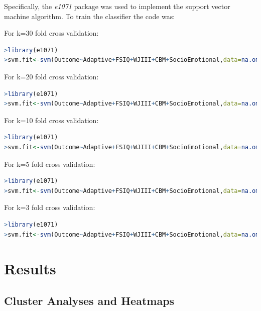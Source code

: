 \documentclass[twoside]{article}
\begin{document}
Specifically, the \textit{e1071} package was used to implement the support vector machine algorithm. To train the classifier the code was:

For k=30 fold cross validation:
\begin{lstlisting}[language=R]
>library(e1071)
>svm.fit<-svm(Outcome~Adaptive+FSIQ+WJIII+CBM+SocioEmotional,data=na.omit(merged_data),kernel="linear",cross=30,probability=TRUE)
\end{lstlisting}

For k=20 fold cross validation:
\begin{lstlisting}[language=R]
>library(e1071)
>svm.fit<-svm(Outcome~Adaptive+FSIQ+WJIII+CBM+SocioEmotional,data=na.omit(merged_data),kernel="linear",cross=20,probability=TRUE)
\end{lstlisting}

For k=10 fold cross validation:
\begin{lstlisting}[language=R]
>library(e1071)
>svm.fit<-svm(Outcome~Adaptive+FSIQ+WJIII+CBM+SocioEmotional,data=na.omit(merged_data),kernel="linear",cross=10,probability=TRUE)
\end{lstlisting}

For k=5 fold cross validation:
\begin{lstlisting}[language=R]
>library(e1071)
>svm.fit<-svm(Outcome~Adaptive+FSIQ+WJIII+CBM+SocioEmotional,data=na.omit(merged_data),kernel="linear",cross=5,probability=TRUE)
\end{lstlisting}

For k=3 fold cross validation: 
\begin{lstlisting}[language=R]
>library(e1071)
>svm.fit<-svm(Outcome~Adaptive+FSIQ+WJIII+CBM+SocioEmotional,data=na.omit(merged_data),kernel="linear",cross=3,probability=TRUE)
\end{lstlisting}
%
\section{Results}
\subsection{Cluster Analyses and Heatmaps}
\end{document}

